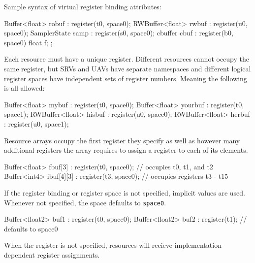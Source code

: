 Sample syntax of virtual register binding attributes:
\begin{HLSL}
  Buffer<float> robuf : register(t0, space0);
  RWBuffer<float> rwbuf : register(u0, space0);
  SamplerState samp : register(s0, space0);
  cbuffer cbuf : register(b0, space0) { float f; };
\end{HLSL}

Each resource must have a unique register. Different resources cannot occupy the same register,
but SRVs and UAVs have separate namespaces and different logical register spaces have independent
sets of register numbers. Meaning the following is all allowed:
\begin{HLSL}
  Buffer<float> mybuf : register(t0, space0);
  Buffer<float> yourbuf : register(t0, space1);
  RWBuffer<float> hisbuf : register(u0, space0);
  RWBuffer<float> herbuf : register(u0, space1);
\end{HLSL}

Resource arrays occupy the first register they specify as well as however many additional registers
the array requires to assign a register to each of its elements.

\begin{HLSL}
  Buffer<float> fbuf[3] : register(t0, space0); // occupies t0, t1, and t2
  Buffer<int4> ibuf[4][3] : register(t3, space0); // occupies registers t3 - t15
\end{HLSL}

If the register binding or register space is not specified, implicit values are used.
Whenever not specified, the space defaults to \texttt{space0}.

\begin{HLSL}
  Buffer<float2> buf1 : register(t0, space0);
  Buffer<float2> buf2 : register(t1); // defaults to space0
\end{HLSL}

When the register is not specified, resources will recieve implementation-dependent register assignments.
